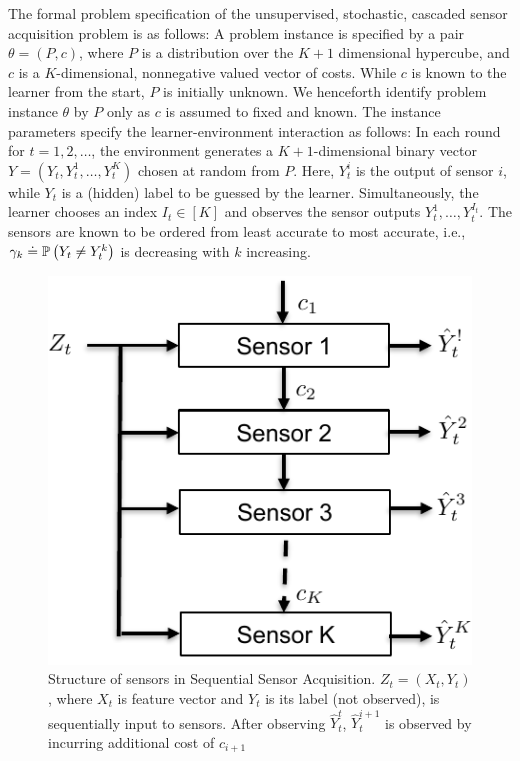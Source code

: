 \newcommand{\ind}[1]{\mathbb{I}\{#1\}}

The formal problem specification of the unsupervised, stochastic, 
cascaded sensor acquisition problem 
is as follows: 
A problem instance is specified by a pair $\theta = (P,c)$, where $P$ is
a distribution over the $K+1$ dimensional hypercube, and $c$ is a $K$-dimensional, nonnegative valued vector
of costs.
While $c$ is known to the learner from the start, $P$ is initially unknown. We henceforth identify problem instance $\theta$ by $P$ only as $c$ is assumed to fixed and known. 
The instance parameters specify the learner-environment interaction as follows:
In each round for $t=1,2,\dots$, 
the environment generates a $K+1$-dimensional binary vector
$Y = (Y_t,Y_t^1,\dots,Y_t^K)$ chosen at random from $P$.
Here, $Y_t^i$ is the output of sensor $i$, while $Y_t$ is a (hidden) label to be guessed by the learner.
Simultaneously, the learner chooses an index $I_t\in [K]$ and observes the sensor outputs $Y_t^1,\dots,Y_t^{I_t}$.
The sensors are known to be ordered from least accurate to most accurate, 
i.e., $\gamma_k \doteq \mathbb{P}\left(Y_t\ne Y_t^k\right)$ is decreasing with $k$ increasing.
\begin{figure}[!h]
	\centering
	\includegraphics[scale=.65]{../Figures/SensorCascade.pdf}
	\caption{Structure of sensors in Sequential Sensor Acquisition. $Z_t=(X_t,Y_t)$, where $X_t$ is feature vector and $Y_t$ is its label (not observed), is sequentially input to sensors. After observing $\hat{Y}_{t}^t$, $\hat{Y}_{t}^{i+1}$ is observed by incurring additional cost of $c_{i+1}$}
	\label{fig:SensorCascade}
	\vspace{-.2cm}
\end{figure} 
